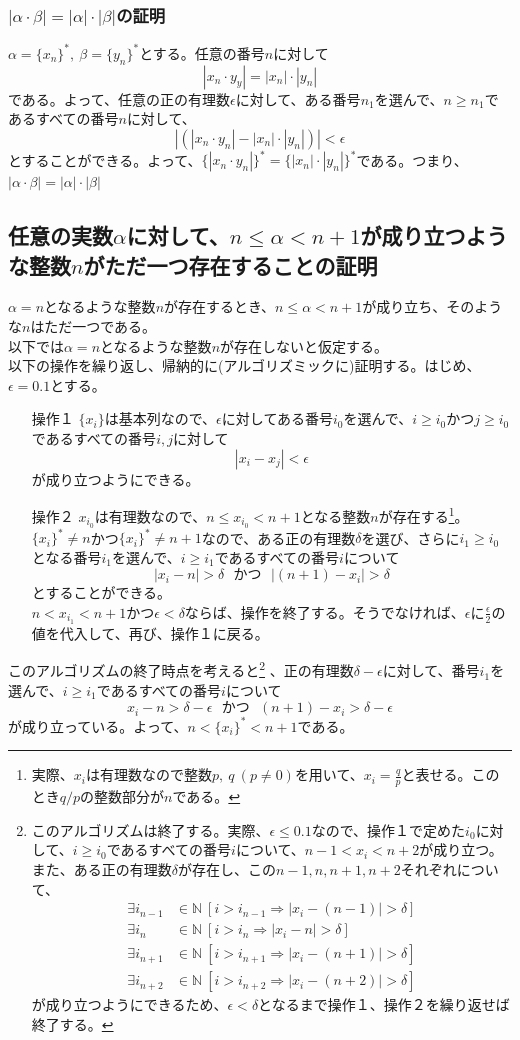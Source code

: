 \documentclass{jsarticle}
\begin{document}
\subsubsection{$|\alpha\cdot\beta|=|\alpha|\cdot|\beta|$の証明}
$\alpha=\{x_n\}^*,\ \beta=\{y_n\}^*$とする。任意の番号$n$に対して
\[|x_n\cdot y_y|=|x_n|\cdot|y_n|\]
である。よって、任意の正の有理数$\epsilon$に対して、ある番号$n_1$を選んで、$n\geq n_1$であるすべての番号$n$に対して、
\[|(|x_n\cdot y_n|-|x_n|\cdot|y_n|)|<\epsilon\]
とすることができる。よって、$\{|x_n\cdot y_n|\}^*=\{|x_n|\cdot|y_n|\}^*$である。つまり、$|\alpha\cdot\beta|=|\alpha|\cdot|\beta|$

\subsection{任意の実数$\alpha$に対して、$n\leq\alpha<n+1$が成り立つような整数$n$がただ一つ存在することの証明}
$\alpha=n$となるような整数$n$が存在するとき、$n\leq\alpha<n+1$が成り立ち、そのような$n$はただ一つである。\\
以下では$\alpha=n$となるような整数$n$が存在しないと仮定する。\\
以下の操作を繰り返し、帰納的に(アルゴリズミックに)証明する。はじめ、$\epsilon=0.1$とする。
\begin{enumerate}
\item[操作１　]
$\{x_i\}$は基本列なので、$\epsilon$に対してある番号$i_0$を選んで、$i\geq i_0$かつ$j\geq i_0$であるすべての番号$i,j$に対して
\[|x_i-x_j|<\epsilon\]
が成り立つようにできる。

\item[操作２　]
$x_{i_0}$は有理数なので、$n\leq x_{i_0}<n+1$となる整数$n$が存在する\footnote{実際、$x_i$は有理数なので整数$p,\ q\ (p\neq0)$を用いて、$x_i=\frac{q}{p}$と表せる。このとき$q/p$の整数部分が$n$である。}。$\{x_i\}^*\neq n$かつ$\{x_i\}^*\neq n+1$なので、ある正の有理数$\delta$を選び、さらに$i_1\geq i_0$となる番号$i_1$を選んで、$i\geq i_1$であるすべての番号$i$について
\[|x_i-n|>\delta \ \ \  かつ\ \ \   |(n+1)-x_i| >\delta\]
とすることができる。\\
$n<x_{i_1}<n+1$かつ$\epsilon<\delta$ならば、操作を終了する。そうでなければ、$\epsilon$に$\frac{\epsilon}{2}$の値を代入して、再び、操作１に戻る。
\end{enumerate}
このアルゴリズムの終了時点を考えると\footnote{このアルゴリズムは終了する。実際、$\epsilon\leq0.1$なので、操作１で定めた$i_0$に対して、$i\geq i_0$であるすべての番号$i$について、$n-1<x_i<n+2$が成り立つ。また、ある正の有理数$\delta$が存在し、この$n-1,n,n+1,n+2$それぞれについて、
\begin{align*}
\exists i_{n-1}& \in \mathbb{N}\ [i>i_{n-1}\Longrightarrow |x_i-(n-1)|>\delta]\\
\exists i_{n}& \in \mathbb{N}\ [i>i_{n}\Longrightarrow |x_i-n|>\delta]\\
\exists i_{n+1}&\in \mathbb{N}\ [i>i_{n+1}\Longrightarrow |x_i-(n+1)|>\delta]\\
\exists i_{n+2}&\in \mathbb{N}\ [i>i_{n+2}\Longrightarrow |x_i-(n+2)|>\delta]
\end{align*}
が成り立つようにできるため、$\epsilon<\delta$となるまで操作１、操作２を繰り返せば終了する。}
、正の有理数$\delta-\epsilon$に対して、番号$i_1$を選んで、$i\geq i_1$であるすべての番号$i$について
\[ x_{i}-n>\delta-\epsilon\ \ \ かつ\ \ \ (n+1)-x_{i}>\delta-\epsilon\]
が成り立っている。よって、$n<\{x_i\}^*<n+1$である。


\end{document}
